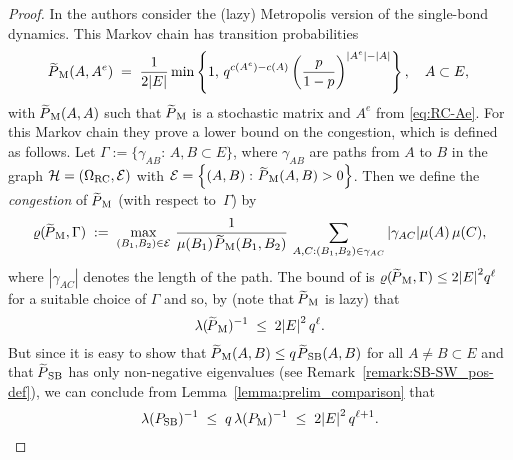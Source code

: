 \documentclass{dis}
\theoremstyle{citing}
\begin{document}
\begin{proof}
In \cite{GeS} the authors consider the (lazy) Metropolis version 
of the single-bond dynamics. This Markov chain has transition 
probabilities 
\[
{\raisebox{2pt}{ ${\widetilde{{}}}$ }\mkern-14mu P}_{\rm M}(A,A^e) \;=\;	\frac1{2{\left\vert {E} \right\vert}}
	\min\left\{1,\,q^{c(A^e)-c(A)}
	\left(\frac{p}{1-p}\right)^{{\left\vert {A^e} \right\vert}-{\left\vert {A} \right\vert}}\right\}, 
	\quad A\subset E,
\]
with ${\raisebox{2pt}{ ${\widetilde{{}}}$ }\mkern-14mu P}_{\rm M}(A,A)$ such that ${\raisebox{2pt}{ ${\widetilde{{}}}$ }\mkern-14mu P}_{\rm M}$ is a stochastic 
matrix and $A^e$ from \eqref{eq:RC-Ae}. 
For this Markov chain they prove a lower bound on the congestion, 
which is defined as follows. Let ${\Gamma}:=\{{\gamma}_{AB}:\, A,B\subset E\}$, 
where ${\gamma}_{AB}$ are paths from $A$ to $B$ in the 
graph $\mathcal{H}=({\Omega}_{\rm RC},\mathcal{E})$ with 
$\mathcal{E}=\left\{(A,B):\,{\raisebox{2pt}{ ${\widetilde{{}}}$ }\mkern-14mu P}_{\rm M}(A,B)>0\right\}$. Then we 
define the \emph{congestion} of ${\raisebox{2pt}{ ${\widetilde{{}}}$ }\mkern-14mu P}_{\rm M}$ (with respect to~${\Gamma}$) by
\[
\varrho({\raisebox{2pt}{ ${\widetilde{{}}}$ }\mkern-14mu P}_{\rm M},{\Gamma}) \;:=\; 
	\max_{(B_1,B_2)\in\mathcal{E}}\,
	\frac{1}{\mu(B_1)\, {\raisebox{2pt}{ ${\widetilde{{}}}$ }\mkern-14mu P}_{\rm M}(B_1,B_2)}\,
	\sum_{A,C: (B_1,B_2)\in{\gamma}_{AC}} {\left\vert {{\gamma}_{AC}} \right\vert} \mu(A)\, \mu(C),
\]
where ${\left\vert {{\gamma}_{AC}} \right\vert}$ denotes the length of the path. 
The bound of \cite[Lemma~16]{GeS} is 
$
\varrho({\raisebox{2pt}{ ${\widetilde{{}}}$ }\mkern-14mu P}_{\rm M},{\Gamma}) \le 2{\left\vert {E} \right\vert}^2 q^\ell\; 
$
for a suitable choice of ${\Gamma}$ and so, by 
\cite[Prop. 1']{DS} (note that ${\raisebox{2pt}{ ${\widetilde{{}}}$ }\mkern-14mu P}_{\rm M}$ is lazy) that
\[
\lambda({\raisebox{2pt}{ ${\widetilde{{}}}$ }\mkern-14mu P}_{\rm M})^{-1} \;\le\; 2{\left\vert {E} \right\vert}^2\,q^\ell.
\]
But since it is easy to show that 
${\raisebox{2pt}{ ${\widetilde{{}}}$ }\mkern-14mu P}_{\rm M}(A,B)\le q \,{{\raisebox{2pt}{ ${\widetilde{{}}}$ }\mkern-14mu P}_{\rm SB}}(A,B)$ for all 
$A\neq B\subset E$ and 
that ${{\raisebox{2pt}{ ${\widetilde{{}}}$ }\mkern-14mu P}_{\rm SB}}$ has only non-negative eigenvalues 
(see Remark~\ref{remark:SB-SW_pos-def}), 
we can conclude from Lemma~\ref{lemma:prelim_comparison} 
that
\[
\lambda(P_{\rm SB})^{-1} 
\;\le\; q\, \lambda(P_{\rm M})^{-1} 
\;\le\; 2{\left\vert {E} \right\vert}^2\,q^{\ell+1}.
\]
\end{proof}
\end{document}
